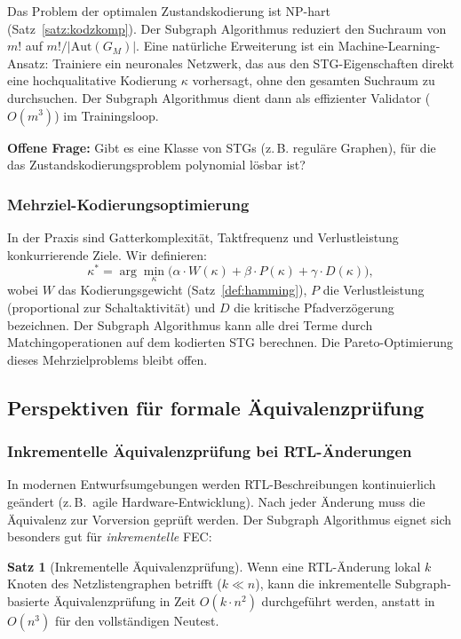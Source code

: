 ﻿\documentclass[a4paper,12pt]{article}
\theoremstyle{definition}
\newtheorem{satz}{Satz}
\begin{document}
Das Problem der optimalen Zustandskodierung ist NP-hart (Satz~\ref{satz:kodzkomp}).
Der Subgraph Algorithmus reduziert den Suchraum von $m!$ auf $m!/|\text{Aut}(G_M)|$.
Eine natürliche Erweiterung ist ein Machine-Learning-Ansatz: Trainiere ein neuronales
Netzwerk, das aus den STG-Eigenschaften direkt eine hochqualitative Kodierung
$\kappa$ vorhersagt, ohne den gesamten Suchraum zu durchsuchen. Der Subgraph
Algorithmus dient dann als effizienter Validator ($O(m^3)$) im Trainingsloop.

\textbf{Offene Frage:} Gibt es eine Klasse von STGs (z.\,B. reguläre Graphen), für
die das Zustandskodierungsproblem polynomial lösbar ist?

\subsubsection{Mehrziel-Kodierungsoptimierung}

In der Praxis sind Gatterkomplexität, Taktfrequenz und Verlustleistung konkurrierende
Ziele. Wir definieren:
\[
  \kappa^* = \arg\min_\kappa \bigl(\alpha \cdot W(\kappa) + \beta \cdot P(\kappa)
  + \gamma \cdot D(\kappa)\bigr),
\]
wobei $W$ das Kodierungsgewicht (Satz~\ref{def:hamming}), $P$ die Verlustleistung
(proportional zur Schaltaktivität) und $D$ die kritische Pfadverzögerung bezeichnen.
Der Subgraph Algorithmus kann alle drei Terme durch Matchingoperationen auf dem
kodierten STG berechnen. Die Pareto-Optimierung dieses Mehrzielproblems bleibt offen.

\subsection{Perspektiven für formale Äquivalenzprüfung}

\subsubsection{Inkrementelle Äquivalenzprüfung bei RTL-Änderungen}

In modernen Entwurfsumgebungen werden RTL-Beschreibungen kontinuierlich geändert
(z.\,B.\ agile Hardware-Entwicklung). Nach jeder Änderung muss die Äquivalenz zur
Vorversion geprüft werden. Der Subgraph Algorithmus eignet sich besonders gut für
\emph{inkrementelle} FEC:

\begin{satz}[Inkrementelle Äquivalenzprüfung]\label{satz:inkrementell_fec}
  Wenn eine RTL-Änderung lokal $k$ Knoten des Netzlistengraphen betrifft
  ($k \ll n$), kann die inkrementelle Subgraph-basierte Äquivalenzprüfung in Zeit
  $O(k \cdot n^2)$ durchgeführt werden, anstatt in $O(n^3)$ für den vollständigen
  Neutest.
\end{satz}
\end{document}
